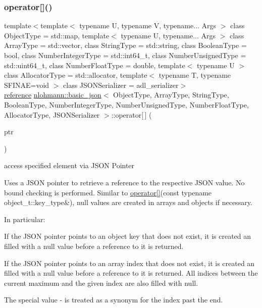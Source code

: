 \subsubsection{\texorpdfstring{operator[]()}{operator[]()}\hspace{0.1cm}{\footnotesize\ttfamily [9/10]}}
{\footnotesize\ttfamily template$<$template$<$ typename U, typename V, typename... Args $>$ class Object\+Type = std\+::map, template$<$ typename U, typename... Args $>$ class Array\+Type = std\+::vector, class String\+Type  = std\+::string, class Boolean\+Type  = bool, class Number\+Integer\+Type  = std\+::int64\+\_\+t, class Number\+Unsigned\+Type  = std\+::uint64\+\_\+t, class Number\+Float\+Type  = double, template$<$ typename U $>$ class Allocator\+Type = std\+::allocator, template$<$ typename T, typename S\+F\+I\+N\+A\+E=void $>$ class J\+S\+O\+N\+Serializer = adl\+\_\+serializer$>$ \\
\mbox{\hyperlink{classnlohmann_1_1basic__json_ac6a5eddd156c776ac75ff54cfe54a5bc}{reference}} \mbox{\hyperlink{classnlohmann_1_1basic__json}{nlohmann\+::basic\+\_\+json}}$<$ Object\+Type, Array\+Type, String\+Type, Boolean\+Type, Number\+Integer\+Type, Number\+Unsigned\+Type, Number\+Float\+Type, Allocator\+Type, J\+S\+O\+N\+Serializer $>$\+::operator\mbox{[}$\,$\mbox{]} (\begin{DoxyParamCaption}\item[{const \mbox{\hyperlink{classnlohmann_1_1basic__json_1_1json__pointer}{json\+\_\+pointer}} \&}]{ptr }\end{DoxyParamCaption})\hspace{0.3cm}{\ttfamily [inline]}}



access specified element via J\+S\+ON Pointer 

Uses a J\+S\+ON pointer to retrieve a reference to the respective J\+S\+ON value. No bound checking is performed. Similar to \mbox{\hyperlink{classnlohmann_1_1basic__json_ac871e3b03fb2eeca9a8de4db2bea760f}{operator\mbox{[}\mbox{]}}}(const typename object\+\_\+t\+::key\+\_\+type\&), {\ttfamily null} values are created in arrays and objects if necessary.

In particular\+:
\begin{DoxyItemize}
\item If the J\+S\+ON pointer points to an object key that does not exist, it is created an filled with a {\ttfamily null} value before a reference to it is returned.
\item If the J\+S\+ON pointer points to an array index that does not exist, it is created an filled with a {\ttfamily null} value before a reference to it is returned. All indices between the current maximum and the given index are also filled with {\ttfamily null}.
\item The special value {\ttfamily -\/} is treated as a synonym for the index past the end.
\end{DoxyItemize}



